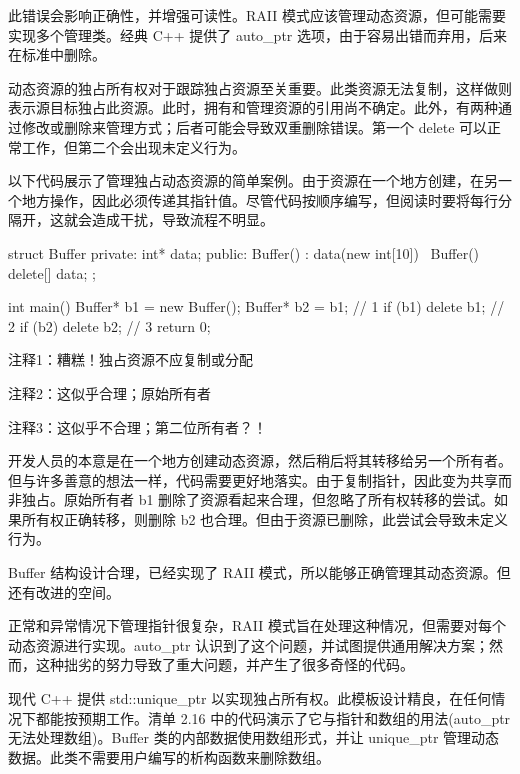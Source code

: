 此错误会影响正确性，并增强可读性。RAII 模式应该管理动态资源，但可能需要实现多个管理类。经典 C++ 提供了 auto\_ptr 选项，由于容易出错而弃用，后来在标准中删除。


动态资源的独占所有权对于跟踪独占资源至关重要。此类资源无法复制，这样做则表示源目标独占此资源。此时，拥有和管理资源的引用尚不确定。此外，有两种通过修改或删除来管理方式；后者可能会导致双重删除错误。第一个 delete 可以正常工作，但第二个会出现未定义行为。

以下代码展示了管理独占动态资源的简单案例。由于资源在一个地方创建，在另一个地方操作，因此必须传递其指针值。尽管代码按顺序编写，但阅读时要将每行分隔开，这就会造成干扰，导致流程不明显。


\begin{cpp}
struct Buffer {
private:
  int* data;
public:
  Buffer() : data(new int[10]) {}
  ~Buffer() { delete[] data; }
};

int main() {
  Buffer* b1 = new Buffer();
  Buffer* b2 = b1; // 1
  if (b1)
    delete b1; // 2
  if (b2)
    delete b2; // 3
  return 0;
}
\end{cpp}

{\footnotesize
注释1：糟糕！独占资源不应复制或分配

注释2：这似乎合理；原始所有者

注释3：这似乎不合理；第二位所有者？！
}


开发人员的本意是在一个地方创建动态资源，然后稍后将其转移给另一个所有者。但与许多善意的想法一样，代码需要更好地落实。由于复制指针，因此变为共享而非独占。原始所有者 b1 删除了资源看起来合理，但忽略了所有权转移的尝试。如果所有权正确转移，则删除 b2 也合理。但由于资源已删除，此尝试会导致未定义行为。

Buffer 结构设计合理，已经实现了 RAII 模式，所以能够正确管理其动态资源。但还有改进的空间。


正常和异常情况下管理指针很复杂，RAII 模式旨在处理这种情况，但需要对每个动态资源进行实现。auto\_ptr 认识到了这个问题，并试图提供通用解决方案；然而，这种拙劣的努力导致了重大问题，并产生了很多奇怪的代码。

现代 C++ 提供 std::unique\_ptr 以实现独占所有权。此模板设计精良，在任何情况下都能按预期工作。清单 2.16 中的代码演示了它与指针和数组的用法(auto\_ptr 无法处理数组)。Buffer 类的内部数据使用数组形式，并让 unique\_ptr 管理动态数据。此类不需要用户编写的析构函数来删除数组。

